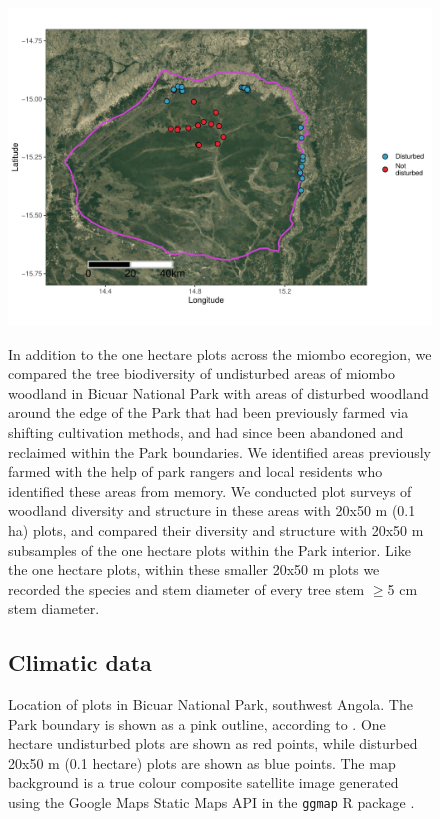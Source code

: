 \documentclass[diversity,article,submit,moreauthors,pdftex]{Definitions/mdpi}
\begin{document}
\begin{figure}[H]
\centering
	\includegraphics[width=\textwidth]{img/bicuar_map}
	\caption{Location of plots in Bicuar National Park, southwest Angola. The Park boundary is shown as a pink outline, according to \citet{WDPA2019}. One hectare undisturbed plots are shown as red points, while disturbed 20x50 m (0.1 hectare) plots are shown as blue points. The map background is a true colour composite satellite image generated using the Google Maps Static Maps API in the \texttt{ggmap} R package \citep{ggmap}.}
	\label{bicuar_map}
In addition to the one hectare plots across the miombo ecoregion, we compared the tree biodiversity of undisturbed areas of miombo woodland in Bicuar National Park with areas of disturbed woodland around the edge of the Park that had been previously farmed via shifting cultivation methods, and had since been abandoned and reclaimed within the Park boundaries. We identified areas previously farmed with the help of park rangers and local residents who identified these areas from memory. We conducted \ndegradplots{} plot surveys of woodland diversity and structure in these areas with 20x50 m (0.1 ha) plots, and compared their diversity and structure with 20x50 m subsamples of the \nplotsbicuar{} one hectare plots within the Park interior. Like the one hectare plots, within these smaller 20x50 m plots we recorded the species and stem diameter of every tree stem $\ge$5 cm stem diameter.

\subsection{Climatic data}


\end{figure}
\end{document}
